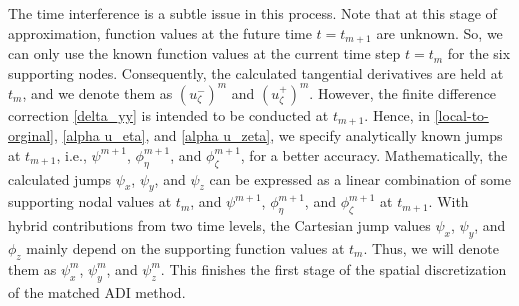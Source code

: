 \documentclass[dissertation]{uathesis}
\begin{document}
\begin{body}
The time interference is a subtle issue in this process. 
Note that at this stage of approximation, function values at the future time $t=t_{m+1}$ are unknown. 
So, we can only use the known function values at the current time step $t=t_{m}$ for 
the six supporting nodes. 
Consequently, the calculated tangential derivatives are held at $t_{m}$, and 
we denote them as $(u^{-}_{\zeta})^m$ and $(u^{+}_{\zeta})^m$. 
However, the finite difference correction \eqref{delta_yy} is intended to be conducted at $t_{m+1}$. Hence, in \eqref{local-to-orginal}, \eqref{alpha u_eta}, and \eqref{alpha u_zeta},  we specify analytically known jumps at $t_{m+1}$, i.e., $\psi^{m+1}$, $\phi_{\eta}^{m+1}$, and  $\phi_{\zeta}^{m+1}$, for a better accuracy. 
Mathematically, the calculated jumps $\psi_x$, $\psi_y$, and $\psi_z$ can be expressed as a linear combination of some supporting nodal values at $t_m$, and $\psi^{m+1}$, $\phi_{\eta}^{m+1}$, and  $\phi_{\zeta}^{m+1}$ at $t_{m+1}$. 
With hybrid contributions from two time levels, the Cartesian jump values $\psi_x$, $\psi_y$, and $\phi_z$ mainly depend on the supporting function values at $t_m$.
Thus, we will denote them as $\psi^m_x$, $\psi^m_y$, and $\psi^m_z$.
This finishes the first stage of the spatial discretization of the matched ADI method. 


\end{body}
\end{document}
